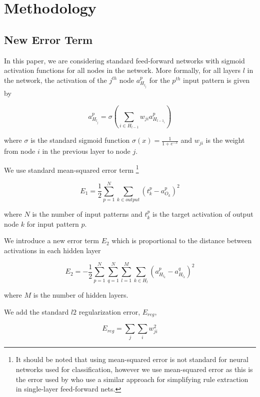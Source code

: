 \section{Methodology}
\label{sec:method}

\subsection{New Error Term}
\label{sec:nn}

In this paper, we are considering standard feed-forward networks with
sigmoid activation functions for all nodes in the network. More formally,
for all layers $l$ in the network, the activation of the $j^{th}$ node
$a_{H_{l_j}}^p$ for the $p^{th}$ input pattern is given by

\begin{equation}
  a_{H_{l_j}}^p = \sigma(\sum_{i\in H_{l-1}}{w_{ji}a_{H_{l-1_i}}^p})
\end{equation}

where $\sigma$ is the standard sigmoid function $\sigma(x)=\frac{1}{1+e^{-x}}$
and $w_{ji}$ is the weight from node $i$ in the previous layer to node $j$.

We use standard mean-squared error term
\footnote{
It should be noted that using
mean-squared error is not standard for neural networks used for
classification, however we use mean-squared error as this is the error
used by \cite{thuan11} who use a similar approach for simplifying rule
extraction in single-layer feed-forward nets.
}

\begin{equation}
  E_1 = \frac{1}{2}\sum_{p=1}^{N} \sum_{k \in output} (t_k^p-a_{O_k}^p)^2
\end{equation}

where $N$ is the number of input patterns and $t_k^p$ is the target activation
of output node $k$ for input pattern $p$.

We introduce a new error term $E_2$ which is proportional to the distance between
activations in each hidden layer

\begin{equation}
  E_2 = -\frac{1}{2}\sum_{p=1}^{N} \sum_{q=1}^{N} \sum_{l=1}^{M} \sum_{k \in H_l} (a_{H_{l_k}}^p - a_{H_{l_k}}^q)^2
\end{equation}

where $M$ is the number of hidden layers.

We add the standard $l2$ regularization error, $E_{reg}$,

\begin{equation}
  E_{reg} = \sum_{j} \sum_{i} w_{ji}^2
\end{equation}

